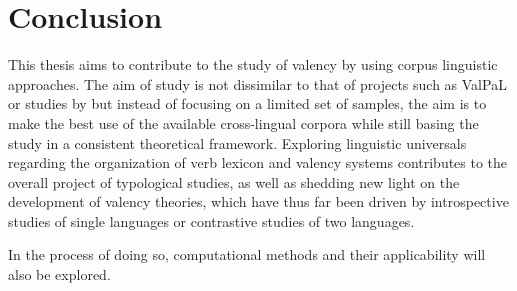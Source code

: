 \section{Conclusion}\label{sec:conclusion}

This thesis aims to contribute to the study of valency by using corpus linguistic approaches. The aim of study is not dissimilar to that of projects such as ValPaL or studies by \citet{say2014} but instead of focusing on a limited set of samples, the aim is to make the best use of the available cross-lingual corpora while still basing the study in a consistent theoretical framework. Exploring linguistic universals regarding the organization of verb lexicon and valency systems contributes to the overall project of typological studies, as well as shedding new light on the development of valency theories, which have thus far been driven by introspective studies of single languages or contrastive studies of two languages.

In the process of doing so, computational methods and their applicability will also be explored.